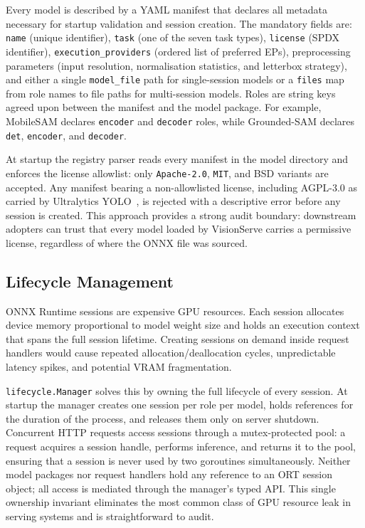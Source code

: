 Every model is described by a YAML manifest that declares all metadata
necessary for startup validation and session creation.
The mandatory fields are: \texttt{name} (unique identifier),
\texttt{task} (one of the seven task types),
\texttt{license} (SPDX identifier),
\texttt{execution\_providers} (ordered list of preferred EPs),
preprocessing parameters (input resolution, normalisation statistics, and
letterbox strategy), and either a single \texttt{model\_file} path for
single-session models or a \texttt{files} map from role names to file paths
for multi-session models.
Roles are string keys agreed upon between the manifest and the model package.
For example, MobileSAM declares \texttt{encoder} and \texttt{decoder} roles,
while Grounded-SAM declares \texttt{det}, \texttt{encoder}, and \texttt{decoder}.

At startup the registry parser reads every manifest in the model directory and
enforces the license allowlist: only \texttt{Apache-2.0}, \texttt{MIT}, and
BSD variants are accepted.
Any manifest bearing a non-allowlisted license, including AGPL-3.0 as
carried by Ultralytics YOLO~\cite{ultralytics2023yolo,agpllicense}, is
rejected with a descriptive error before any session is created.
This approach provides a strong audit boundary: downstream adopters can trust
that every model loaded by VisionServe carries a permissive license, regardless
of where the ONNX file was sourced.

\subsection{Lifecycle Management}
\label{sec:design:lifecycle}

ONNX Runtime sessions are expensive GPU resources. Each session allocates
device memory proportional to model weight size and holds an execution context
that spans the full session lifetime.
Creating sessions on demand inside request handlers would cause repeated
allocation/deallocation cycles, unpredictable latency spikes, and potential
VRAM fragmentation.

\texttt{lifecycle.Manager} solves this by owning the full lifecycle of every
session.
At startup the manager creates one session per role per model, holds references
for the duration of the process, and releases them only on server shutdown.
Concurrent HTTP requests access sessions through a mutex-protected pool: a
request acquires a session handle, performs inference, and returns it to the
pool, ensuring that a session is never used by two goroutines simultaneously.
Neither model packages nor request handlers hold any reference to an ORT
session object; all access is mediated through the manager's typed API.
This single ownership invariant eliminates the most common class of
GPU resource leak in serving systems and is straightforward to audit.

